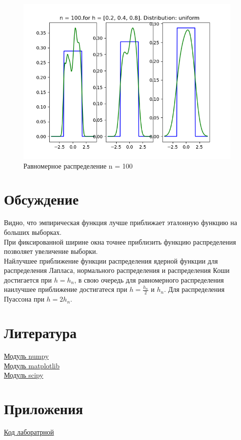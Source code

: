 \documentclass[a4]{article}
\begin{document}
\begin{center}
\begin{figure}[h!]
			\includegraphics[width=\textwidth]{uniformker100.png}
			\caption[Равномерное распределение n = 100]{Равномерное распределение n = 100}
		\end{figure}
		
	\end{center}
		
	\newpage
	\section{Обсуждение}
		Видно, что эмпирическая функция лучше приближает эталонную функцию на больших выборках.\\
		
		При фиксированной ширине окна точнее приблизить функцию распределения позволяет увеличение выборки.\\
		
		Найлучшее приближение функции распределения ядерной функции для распределения Лапласа, нормального распределения и распределения Коши достигается при $h =  h_n$, в свою очередь для равномерного распределения наилучшее приближение достигатеся при $ h = \frac{h_n}{2}$ и $h_n$. Для распределения Пуассона при $h = 2h_n$.
	
	\section{Литература}
	
	\href{https://numpy.org/doc/stable/}{Модуль numpy}\\
	
	\href{https://matplotlib.org/}{Модуль matplotlib}\\
	
	\href{https://www.scipy.org/docs.html}{Модуль scipy}\\
	
	
	\section{Приложения}
	
	\href{https://github.com/Sergey-Sharapov/MatStat_labs/blob/main/lab4/lab4.py}{Код лаборатрной}
	
	
\end{document}
